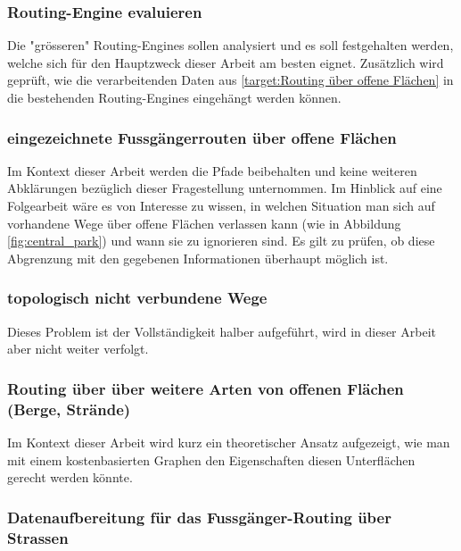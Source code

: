 \subsubsection{Routing-Engine evaluieren}
\label{target:Routing-Enginge evaluieren}
Die "grösseren" \glspl{Routing-Engine} sollen analysiert und es soll festgehalten werden, welche sich für den Hauptzweck dieser Arbeit am besten eignet. Zusätzlich wird geprüft, wie die verarbeitenden Daten aus \ref{target:Routing über offene Flächen} in die bestehenden Routing-Engines eingehängt werden können.

\subsubsection{eingezeichnete Fussgängerrouten über offene Flächen}
\label{target:eingezeichnete Fussgängerrouten über offene Flächen}
Im Kontext dieser Arbeit werden die Pfade beibehalten und keine weiteren Abklärungen bezüglich dieser Fragestellung unternommen. Im Hinblick auf eine Folgearbeit wäre es von Interesse zu wissen, in welchen Situation man sich auf vorhandene Wege über offene Flächen verlassen kann (wie in Abbildung \ref{fig:central_park}) und wann sie zu ignorieren sind. Es gilt zu prüfen, ob diese Abgrenzung mit den gegebenen Informationen überhaupt möglich ist. 

\subsubsection{topologisch nicht verbundene Wege}
\label{target:topologisch nicht verbundene Wege}
Dieses Problem ist der Vollständigkeit halber aufgeführt, wird in dieser Arbeit aber nicht weiter verfolgt.

\subsubsection{Routing über über weitere Arten von offenen Flächen (Berge, Strände)}
\label{target:Routing über über weitere Arten von offenen Flächen (Berge, Strände)}
Im Kontext dieser Arbeit wird kurz ein theoretischer Ansatz aufgezeigt, wie man mit einem kostenbasierten Graphen den Eigenschaften diesen Unterflächen gerecht werden könnte.

\subsubsection{Datenaufbereitung für das Fussgänger-Routing über Strassen}
\label{target:Datenaufbereitung für das Fussgänger-Routing über Strassen}


